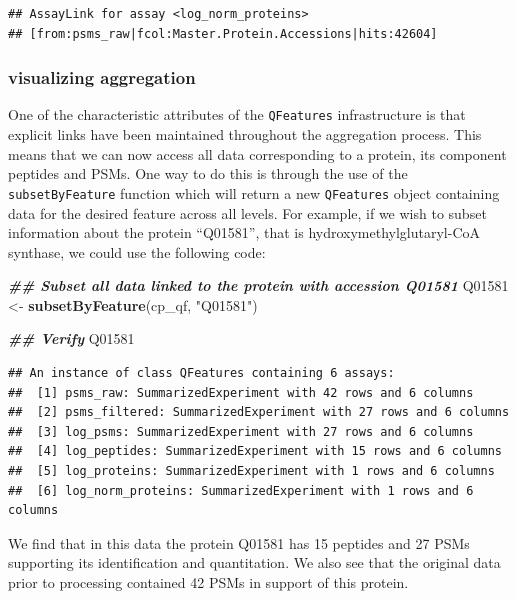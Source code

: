 \documentclass[9pt,a4paper,]{extarticle}
\newenvironment{Shaded}{\begin{snugshade}}{\end{snugshade}}
\newcommand{\DocumentationTok}[1]{\textcolor[rgb]{0.56,0.35,0.01}{\textbf{\textit{#1}}}}
\newcommand{\FunctionTok}[1]{\textcolor[rgb]{0.13,0.29,0.53}{\textbf{#1}}}
\newcommand{\NormalTok}[1]{#1}
\newcommand{\OtherTok}[1]{\textcolor[rgb]{0.56,0.35,0.01}{#1}}
\newcommand{\StringTok}[1]{\textcolor[rgb]{0.31,0.60,0.02}{#1}}
\begin{document}
\begin{verbatim}
## AssayLink for assay <log_norm_proteins>
## [from:psms_raw|fcol:Master.Protein.Accessions|hits:42604]
\end{verbatim}

\subsubsection{visualizing aggregation}\label{visualizing-aggregation}

One of the characteristic attributes of the \texttt{QFeatures} infrastructure is that
explicit links have been maintained throughout the aggregation process. This
means that we can now access all data corresponding to a protein, its component
peptides and PSMs. One way to do this is through the use of the
\texttt{subsetByFeature} function which will return a new \texttt{QFeatures} object containing
data for the desired feature across all levels. For example, if we wish to
subset information about the protein ``Q01581'', that is hydroxymethylglutaryl-CoA
synthase, we could use the following code:

\begin{Shaded}
\begin{Highlighting}[]
\DocumentationTok{\#\# Subset all data linked to the protein with accession Q01581}
\NormalTok{Q01581 }\OtherTok{\textless{}{-}} \FunctionTok{subsetByFeature}\NormalTok{(cp\_qf, }\StringTok{"Q01581"}\NormalTok{)}

\DocumentationTok{\#\# Verify}
\NormalTok{Q01581}
\end{Highlighting}
\end{Shaded}

\begin{verbatim}
## An instance of class QFeatures containing 6 assays:
##  [1] psms_raw: SummarizedExperiment with 42 rows and 6 columns 
##  [2] psms_filtered: SummarizedExperiment with 27 rows and 6 columns 
##  [3] log_psms: SummarizedExperiment with 27 rows and 6 columns 
##  [4] log_peptides: SummarizedExperiment with 15 rows and 6 columns 
##  [5] log_proteins: SummarizedExperiment with 1 rows and 6 columns 
##  [6] log_norm_proteins: SummarizedExperiment with 1 rows and 6 columns
\end{verbatim}

We find that in this data the protein Q01581 has 15
peptides and 27 PSMs supporting its identification
and quantitation. We also see that the original data prior to processing contained
42 PSMs in support of this protein.
\end{document}
